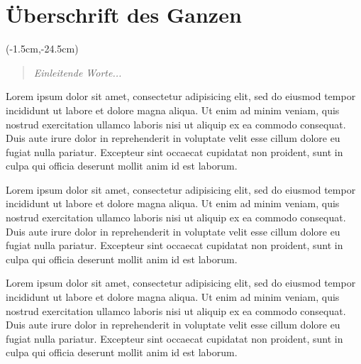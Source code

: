 \documentclass[	paper=a4,
				fontsize=10pt,
				twoside,
				headings=small]{scrartcl}
\begin{document}
 
	
\thispagestyle{empty}  	%

\part*{Überschrift des Ganzen}

\thisfancyput*(-1.5cm,-24.5cm){} %

\begin{abstract}\noindent \emph{Einleitende Worte...}\end{abstract}                

\begin{multicols}{2} %

\begin{linenumbers}  %

\noindent Lorem ipsum dolor sit amet, consectetur adipisicing elit, sed do eiusmod
tempor incididunt ut labore et dolore magna aliqua. Ut enim ad minim veniam,
quis nostrud exercitation ullamco laboris nisi ut aliquip ex ea commodo
consequat. Duis aute irure dolor in reprehenderit in voluptate velit esse
cillum dolore eu fugiat nulla pariatur. Excepteur sint occaecat cupidatat non
proident, sunt in culpa qui officia deserunt mollit anim id est laborum.   

%
%

Lorem ipsum dolor sit amet, consectetur adipisicing elit, sed do eiusmod
tempor incididunt ut labore et dolore magna aliqua. Ut enim ad minim veniam,
quis nostrud exercitation ullamco laboris nisi ut aliquip ex ea commodo
consequat. Duis aute irure dolor in reprehenderit in voluptate velit esse
cillum dolore eu fugiat nulla pariatur. Excepteur sint occaecat cupidatat non
proident, sunt in culpa qui officia deserunt mollit anim id est laborum.

Lorem ipsum dolor sit amet, consectetur adipisicing elit, sed do eiusmod
tempor incididunt ut labore et dolore magna aliqua. Ut enim ad minim veniam,
quis nostrud exercitation ullamco laboris nisi ut aliquip ex ea commodo
consequat. Duis aute irure dolor in reprehenderit in voluptate velit esse
cillum dolore eu fugiat nulla pariatur. Excepteur sint occaecat cupidatat non
proident, sunt in culpa qui officia deserunt mollit anim id est laborum.


\end{linenumbers}
\end{multicols}
\end{document}
